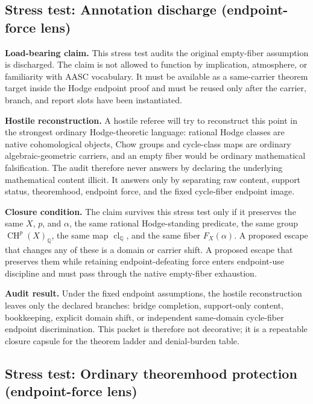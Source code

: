 \documentclass[11pt]{article}
\newcommand{\QQ}{\mathbb{Q}}
\newcommand{\CH}{\operatorname{CH}}
\newcommand{\clQ}{\operatorname{cl}_{\QQ}}
\begin{document}
\subsection{Stress test: Annotation discharge (endpoint-force lens)}

\par\noindent\textbf{Load-bearing claim.} This stress test audits the original empty-fiber assumption is discharged. The claim is not allowed to function by implication, atmosphere, or familiarity with AASC vocabulary. It must be available as a same-carrier theorem target inside the Hodge endpoint proof and must be reused only after the carrier, branch, and report slots have been instantiated.

\par\noindent\textbf{Hostile reconstruction.} A hostile referee will try to reconstruct this point in the strongest ordinary Hodge-theoretic language: rational Hodge classes are native cohomological objects, Chow groups and cycle-class maps are ordinary algebraic-geometric carriers, and an empty fiber would be ordinary mathematical falsification. The audit therefore never answers by declaring the underlying mathematical content illicit. It answers only by separating raw content, support status, theoremhood, endpoint force, and the fixed cycle-fiber endpoint image.

\par\noindent\textbf{Closure condition.} The claim survives this stress test only if it preserves the same $X$, $p$, and $\alpha$, the same rational Hodge-standing predicate, the same group $\CH^p(X)_\QQ$, the same map $\clQ$, and the same fiber $F_X(\alpha)$. A proposed escape that changes any of these is a domain or carrier shift. A proposed escape that preserves them while retaining endpoint-defeating force enters endpoint-use discipline and must pass through the native empty-fiber exhaustion.

\par\noindent\textbf{Audit result.} Under the fixed endpoint assumptions, the hostile reconstruction leaves only the declared branches: bridge completion, support-only content, bookkeeping, explicit domain shift, or independent same-domain cycle-fiber endpoint discrimination. This packet is therefore not decorative; it is a repeatable closure capsule for the theorem ladder and denial-burden table.


\subsection{Stress test: Ordinary theoremhood protection (endpoint-force lens)}
\end{document}
